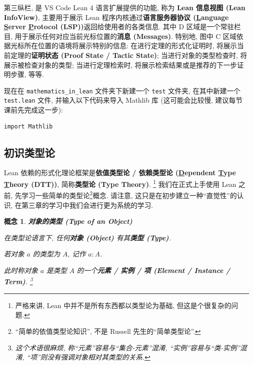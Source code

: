 \documentclass[UTF8]{ctexart}
\DeclareMathOperator{\0}{\mathbf{0}}                    %
\newcommand{\<}{\langle}
\renewcommand{\>}{\rangle}                              %
\newenvironment{dfn_box}{
    \begin{tcolorbox}[enhanced, colback=dfn_green2, boxrule=0pt, frame hidden,
        borderline west={0.7mm}{0.1mm}{dfn_green1},breakable]
    }
    {\end{tcolorbox}}
\theoremstyle{MyStyle} %
\newtheorem{concept}[definition]{概念}
\newenvironment{cpt}[1]
{
    \begin{dfn_box}
        \begin{concept}
            \textbf{#1}
            \newline
}
{
        \end{concept}
    \end{dfn_box}
}
\begin{document}
        第三纵栏, 是 VS Code Lean 4 语言扩展提供的功能, 称为 \textbf{Lean 信息视图 (Lean InfoView)}, 主要用于展示 Lean 程序内核通过\textbf{语言服务器协议 (\underline{L}anguage \underline{S}erver \underline{P}rotocol (LSP))}返回给使用者的各类信息. 其中 D 区域是一个常驻栏目, 用于展示任何对应当前光标位置的\textbf{消息 (Messages)}. 特别地, 图中 C 区域依据光标所在位置的语境将展示特别的信息: 在进行定理的形式化证明时, 将展示当前定理的\textbf{证明状态 (Proof State / Tactic State)}; 当进行对象的类型检查时, 将展示被检查对象的类型; 当进行定理检索时, 将展示检索结果或是推荐的下一步证明步骤, 等等. 
        
        现在在 \texttt{mathematics\_in\_lean} 文件夹下新建一个 \texttt{test} 文件夹, 在其中新建一个 \texttt{test.lean} 文件, 并输入以下代码来导入 Mathlib 库 (这可能会比较慢, 建议每节课前先完成这一步): 
        \begin{lstlisting}[style=lean]
    import Mathlib
        \end{lstlisting}

    \subsection{初识类型论}
        
        Lean 依赖的形式化理论框架是\textbf{依值类型论 / 依赖类型论 (\underline{D}ependent \underline{T}ype \underline{T}heory (DTT))}, 简称\textbf{类型论 (Type Theory)}. \footnote{严格来讲, Lean 中并不是所有东西都以类型论为基础, 但这是个很复杂的问题. } 我们在正式上手使用 Lean 之前, 先学习一些简单的类型论\footnote{``简单的依值类型论知识'', 不是 Russell 先生的``简单类型论''. }概念. 请注意, 这只是在初步建立一种``直觉性''的认识, 在第三章的学习中我们会进行更为系统的学习. 

        
        
        \begin{cpt}
            {对象的类型 (Type of an Object)}
            在类型论语言下, 任何\textbf{对象 (Object)} 有其\textbf{类型 (Type)}. 
            
            若对象 $a$ 的类型为 $A$, 记作 $a : A$. 
            
            此时称对象 $a$ 是类型 $A$ 的一个\textbf{元素 / 实例 / 项 (Element / Instance / Term)}. \footnote{这个术语很麻烦, 称``元素''容易与``集合-元素''混淆, ``实例''容易与``类-实例''混淆, ``项''则没有强调对象相对其类型的关系. }
        \end{cpt}
        
\end{document}
